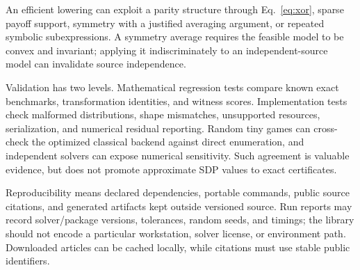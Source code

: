 An efficient lowering can exploit a parity structure through
Eq.~\eqref{eq:xor}, sparse payoff support, symmetry with a justified averaging
argument, or repeated symbolic subexpressions. A symmetry average requires
the feasible model to be convex and invariant; applying it indiscriminately
to an independent-source model can invalidate source independence.

Validation has two levels. Mathematical regression tests compare known exact
benchmarks, transformation identities, and witness scores. Implementation
tests check malformed distributions, shape mismatches, unsupported resources,
serialization, and numerical residual reporting. Random tiny games can
cross-check the optimized classical backend against direct enumeration, and
independent solvers can expose numerical sensitivity. Such agreement is
valuable evidence, but does not promote approximate SDP values to exact
certificates.

Reproducibility means declared dependencies, portable commands, public source
citations, and generated artifacts kept outside versioned source. Run reports
may record solver/package versions, tolerances, random seeds, and timings;
the library should not encode a particular workstation, solver license, or
environment path. Downloaded articles can be cached locally, while citations
must use stable public identifiers.
